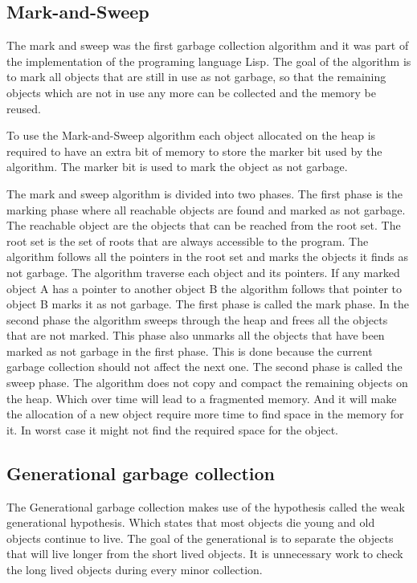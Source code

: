 \documentclass[11pt, a4paper]{article}
\begin{document}
\subsection{Mark-and-Sweep}
The mark and sweep was the first garbage collection algorithm and it was part of the implementation of the programing language Lisp\cite{mark}. The goal of the algorithm is to mark all objects that are still in use as not garbage, so that the remaining objects which are not in use any more can be collected and the memory be reused.

To use the Mark-and-Sweep algorithm each object allocated on the heap is required to have an extra bit of memory to store the marker bit used by the algorithm. The marker bit is used to mark the object as not garbage\cite{basen}.

The mark and sweep algorithm is divided into two phases. The first phase is the marking phase where all reachable objects are found and marked as not garbage. The reachable object are the objects that can be reached from the root set. The root set is the set of roots that are always accessible to the program. The algorithm follows all the pointers in the root set and marks the objects it finds as not garbage. The algorithm traverse each object and its pointers. If any marked object A has a pointer to another object B the algorithm follows that pointer to object B marks it as not garbage. The first phase is called the mark phase\cite{mark}. 
In the second phase the algorithm sweeps through the heap and frees all the objects that are not marked. This phase also unmarks all the objects that have been marked as not garbage in the first phase. This is done because the current garbage collection should not affect the next one. The second phase is called the sweep phase. The algorithm does not copy and compact the remaining objects on the heap. Which over time will lead to a fragmented memory. And it will make the allocation of a new object require more time to find space in the memory for it. In worst case it might not find the required space for the object\cite{mark}. 


\subsection{Generational garbage collection}

The Generational garbage collection makes use of the hypothesis called the weak generational hypothesis. Which states that most objects die young and old objects continue to live\cite{Ungar}. The goal of the generational is to separate the objects that will live longer from the short lived objects. It is unnecessary work to check the long lived objects during every minor collection.
\end{document}
